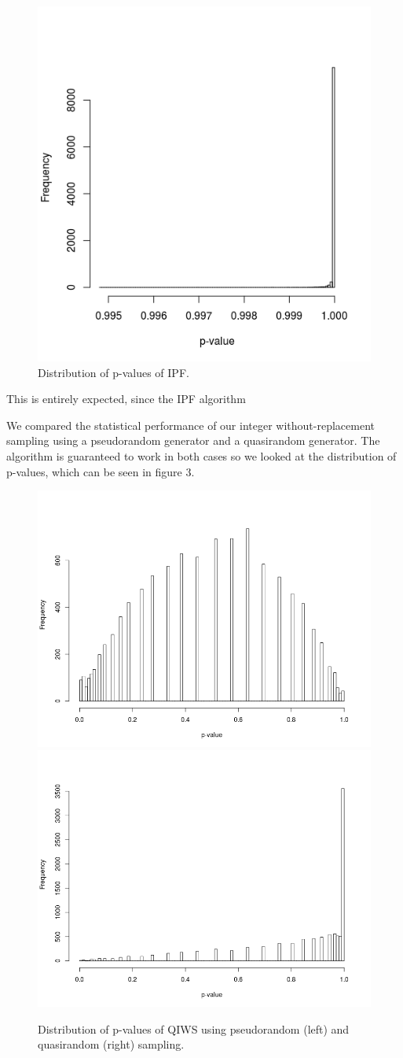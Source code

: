 \documentclass[]{article}
\begin{document}
\begin{figure}[H]

{\centering \includegraphics[width=0.5\linewidth]{figures/ipf_pvalue_dist} 

}

\caption{Distribution of p-values of IPF.}\label{fig:unnamed-chunk-3}
\end{figure}

This is entirely expected, since the IPF algorithm 

We compared the statistical performance of our integer without-replacement sampling using a pseudorandom
generator and a quasirandom generator. The algorithm is guaranteed to
work in both cases so we looked at the distribution of p-values, which
can be seen in figure 3.

\begin{figure}[H]
\includegraphics[width=0.5\linewidth]{figures/iqws_prng_pvalue_dist} \includegraphics[width=0.5\linewidth]{figures/iqws_pvalue_dist} \caption{Distribution of p-values of QIWS using pseudorandom (left) and quasirandom (right) sampling.}\label{fig:unnamed-chunk-4}
\end{figure}
\end{document}

